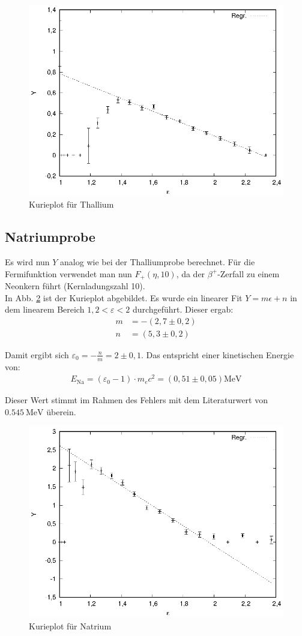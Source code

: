 \begin{figure}[h]
\centering
\includegraphics[width=0.75\linewidth]{data/ti.eps}
\caption{Kurieplot für Thallium}
\label{fig:tl}
\end{figure}

\newpage

\subsection{Natriumprobe}
Es wird nun $Y$ analog wie bei der Thalliumprobe berechnet. Für die Fermifunktion verwendet man nun $F_+(\eta, 10)$, da der $\beta^+$-Zerfall zu einem Neonkern führt (Kernladungszahl 10).\\

In Abb. \ref{fig:na} ist der Kurieplot abgebildet. Es wurde ein linearer Fit $Y = m \epsilon + n$ in dem linearem Bereich $1,2 < \varepsilon < 2$ durchgeführt. Dieser ergab:
\begin{align*}
m &= -\si{(2,7\pm 0,2)}\\
n &= \si{(5,3 \pm 0,2)}
\end{align*}

Damit ergibt sich $\varepsilon_0 = -\frac{n}{m} = 2 \pm 0,1$. Das entspricht einer kinetischen Energie von:
\begin{align*}
E_\mathrm{Na} = (\varepsilon_0 - 1)\cdot m_ec^2 = \si{(0,51 \pm 0,05)\mega\eV}
\end{align*}

Dieser Wert stimmt im Rahmen des Fehlers mit dem Literaturwert\cite{naenergy} von $\SI{0,545}{\mega\eV}$ überein.

\begin{figure}[h]
\centering
\includegraphics[width=0.75\linewidth]{data/na.eps}
\caption{Kurieplot für Natrium}
\label{fig:na}
\end{figure}
